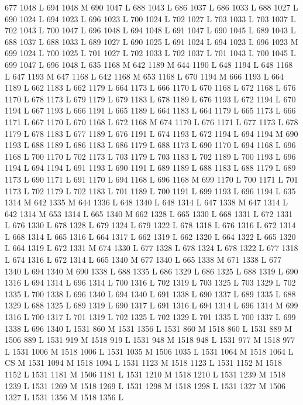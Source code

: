 {{{{{{{{{{{{{{{{{{677 1048 L
694 1048 M 690 1047 L
688 1043 L
686 1037 L
686 1033 L
688 1027 L
690 1024 L
694 1023 L
696 1023 L
700 1024 L
702 1027 L
703 1033 L
703 1037 L
702 1043 L
700 1047 L
696 1048 L
694 1048 L
691 1047 L
690 1045 L
689 1043 L
688 1037 L
688 1033 L
689 1027 L
690 1025 L
691 1024 L
694 1023 L
696 1023 M 699 1024 L
700 1025 L
701 1027 L
702 1033 L
702 1037 L
701 1043 L
700 1045 L
699 1047 L
696 1048 L
635 1168 M 642 1189 M 644 1190 L
648 1194 L
648 1168 L
647 1193 M 647 1168 L
642 1168 M 653 1168 L
670 1194 M 666 1193 L
664 1189 L
662 1183 L
662 1179 L
664 1173 L
666 1170 L
670 1168 L
672 1168 L
676 1170 L
678 1173 L
679 1179 L
679 1183 L
678 1189 L
676 1193 L
672 1194 L
670 1194 L
667 1193 L
666 1191 L
665 1189 L
664 1183 L
664 1179 L
665 1173 L
666 1171 L
667 1170 L
670 1168 L
672 1168 M 674 1170 L
676 1171 L
677 1173 L
678 1179 L
678 1183 L
677 1189 L
676 1191 L
674 1193 L
672 1194 L
694 1194 M 690 1193 L
688 1189 L
686 1183 L
686 1179 L
688 1173 L
690 1170 L
694 1168 L
696 1168 L
700 1170 L
702 1173 L
703 1179 L
703 1183 L
702 1189 L
700 1193 L
696 1194 L
694 1194 L
691 1193 L
690 1191 L
689 1189 L
688 1183 L
688 1179 L
689 1173 L
690 1171 L
691 1170 L
694 1168 L
696 1168 M 699 1170 L
700 1171 L
701 1173 L
702 1179 L
702 1183 L
701 1189 L
700 1191 L
699 1193 L
696 1194 L
635 1314 M 642 1335 M 644 1336 L
648 1340 L
648 1314 L
647 1338 M 647 1314 L
642 1314 M 653 1314 L
665 1340 M 662 1328 L
665 1330 L
668 1331 L
672 1331 L
676 1330 L
678 1328 L
679 1324 L
679 1322 L
678 1318 L
676 1316 L
672 1314 L
668 1314 L
665 1316 L
664 1317 L
662 1319 L
662 1320 L
664 1322 L
665 1320 L
664 1319 L
672 1331 M 674 1330 L
677 1328 L
678 1324 L
678 1322 L
677 1318 L
674 1316 L
672 1314 L
665 1340 M 677 1340 L
665 1338 M 671 1338 L
677 1340 L
694 1340 M 690 1338 L
688 1335 L
686 1329 L
686 1325 L
688 1319 L
690 1316 L
694 1314 L
696 1314 L
700 1316 L
702 1319 L
703 1325 L
703 1329 L
702 1335 L
700 1338 L
696 1340 L
694 1340 L
691 1338 L
690 1337 L
689 1335 L
688 1329 L
688 1325 L
689 1319 L
690 1317 L
691 1316 L
694 1314 L
696 1314 M 699 1316 L
700 1317 L
701 1319 L
702 1325 L
702 1329 L
701 1335 L
700 1337 L
699 1338 L
696 1340 L
1531 860 M 1531 1356 L
1531 860 M 1518 860 L
1531 889 M 1506 889 L
1531 919 M 1518 919 L
1531 948 M 1518 948 L
1531 977 M 1518 977 L
1531 1006 M 1518 1006 L
1531 1035 M 1506 1035 L
1531 1064 M 1518 1064 L
CS M
1531 1094 M 1518 1094 L
1531 1123 M 1518 1123 L
1531 1152 M 1518 1152 L
1531 1181 M 1506 1181 L
1531 1210 M 1518 1210 L
1531 1239 M 1518 1239 L
1531 1269 M 1518 1269 L
1531 1298 M 1518 1298 L
1531 1327 M 1506 1327 L
1531 1356 M 1518 1356 L
}}}}}}}}}}}}}}}}}}
